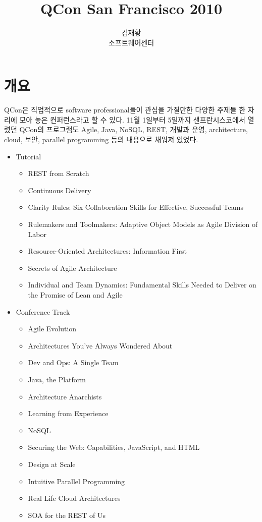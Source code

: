 \documentclass[11pt]{article}
\title{QCon San Francisco 2010}
\author{김재황 \\ 소프트웨어센터}
\begin{document}
\maketitle

\section{개요}

QCon은 직업적으로 software professional들이 관심을 가질만한 
다양한 주제들 한 자리에 모아 놓은 컨퍼런스라고 할 수 있다. 11월 1일부터 5일까지
샌프란시스코에서 열렸던 QCon의 프로그램도 Agile, Java, NoSQL, REST, 
개발과 운영, architecture, cloud, 보안, parallel programming
등의 내용으로 채워져 있었다. 

\begin{itemize}
\item Tutorial
    \begin{itemize}
    \item REST from Scratch
    \item Continuous Delivery
    \item  Clarity Rules: Six Collaboration Skills for Effective, Successful Teams
    \item Rulemakers and Toolmakers: Adaptive Object Models as Agile Division of Labor
    \item Resource-Oriented Architectures: Information First
    \item Secrets of Agile Architecture
    \item Individual and Team Dynamics: Fundamental Skills Needed to Deliver on the Promise of Lean and Agile
    \end{itemize}
\item Conference Track
    \begin{itemize}
    \item Agile Evolution
    \item Architectures You've Always Wondered About
    \item Dev and Ops: A Single Team
    \item Java, the Platform
    \item Architecture Anarchists
    \item Learning from Experience
    \item NoSQL
    \item Securing the Web: Capabilities, JavaScript, and HTML
    \item Design at Scale
    \item Intuitive Parallel Programming
    \item Real Life Cloud Architectures
    \item SOA for the REST of Us
    \end{itemize}
\end{itemize}
\end{document}
